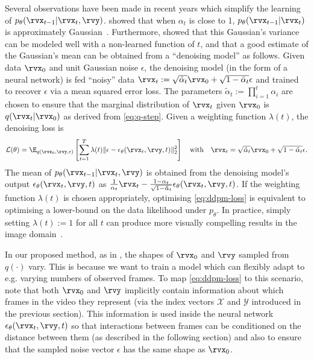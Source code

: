 Several observations have been made in recent years which simplify the learning of $p_\theta(\rvx_{t-1}|\rvx_t,\rvy)$. \citet{sohl2015deep} showed that when $\alpha_t$ is close to 1, $p_\theta(\rvx_{t-1}|\rvx_t)$ is approximately Gaussian~\cite{sohl2015deep}. Furthermore, \citet{ho2020denoising} showed that this Gaussian's variance can be modeled well with a non-learned function of $t$, and that a good estimate of the Gaussian's mean can be obtained from a ``denoising model'' as follows. Given data $\rvx_0$ and unit Gaussian noise $\epsilon$, the denoising model (in the form of a neural network) is fed ``noisy'' data $\rvx_t := \sqrt{\tilde{\alpha}_t} \rvx_0 + \sqrt{1 - \tilde{\alpha}_t} \epsilon$ and trained to recover $\epsilon$ via a mean squared error loss. The parameters $\tilde{\alpha}_t := \prod_{i=1}^t \alpha_i$ are chosen to ensure that the marginal distribution of $\rvx_t$ given $\rvx_0$ is $q(\rvx_t|\rvx_0)$ as derived from \cref{eq:q-step}. Given a weighting function $\lambda(t)$, the denoising loss is
\begin{equation} \label{eq:ddpm-loss}
    \mathcal{L}(\theta) = \E_{q(\rvx_0, \rvy, \epsilon)} \left[ \sum_{t=1}^T \lambda(t) \lVert \epsilon - \epsilon_\theta(\rvx_t, \rvy, t) \rVert_2^2 \right] \quad \text{with} \quad \rvx_t = \sqrt{\tilde{\alpha}_t} \rvx_0 + \sqrt{1 - \tilde{\alpha}_t} \epsilon.
\end{equation}
The mean of $p_\theta(\rvx_{t-1}|\rvx_t,\rvy)$ is obtained from the denoising model's output $\epsilon_\theta(\rvx_t, \rvy, t)$ as ${\frac{1}{\alpha_t}\rvx_t - \frac{1-\alpha_t}{\sqrt{1-\tilde{\alpha}_t}}\epsilon_\theta(\rvx_t, \rvy, t)}$.
If the weighting function $\lambda(t)$ is chosen appropriately, optimising \cref{eq:ddpm-loss} is equivalent to optimising a lower-bound on the data likelihood under $p_\theta$. In practice, simply setting $\lambda(t) := 1$ for all $t$ can produce more visually compelling results in the image domain~\citep{ho2020denoising}.

In our proposed method, as in \citet{tashiro2021csdi}, the shapes of $\rvx_0$ and $\rvy$ sampled from $q(\cdot)$ vary. This is because we want to train a model which can flexibly adapt to e.g. varying numbers of observed frames. To map \cref{eq:ddpm-loss} to this scenario, note that both $\rvx_0$ and $\rvy$ implicitly contain information about which frames in the video they represent (via the index vectors $\mathcal{X}$ and $\mathcal{Y}$ introduced in the previous section). This information is used inside the neural network $\epsilon_\theta(\rvx_t,\rvy, t)$ so that interactions between frames can be conditioned on the distance between them (as described in the following section) and also to ensure that the sampled noise vector $\epsilon$ has the same shape as $\rvx_0$.


